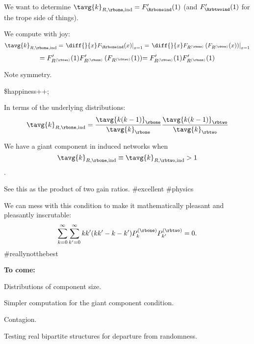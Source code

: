       We want to determine $\tavg{k}_{R,\rbone,\textnormal{ind}} = F'_{\Rrboneind}(1)$ 
      (and $F'_{\Rrbtwoind}(1)$ for the trope side of things).
    
      We compute with joy:
      $$
      \tavg{k}_{R,\rbone,\textnormal{ind}}
      =
      \left.
      \diff{}{x}
        F_{\Rrboneind}(x)
      \right|_{x=1}
      =
      {
      \left.
      \diff{}{x}
        F_{R^{(\rbone)}}
        \left(
          F_{R^{(\rbtwo)}}(x)      
        \right)
      \right|_{x=1}
    }
    $$
    $$
    {
      =
      F'_{R^{(\rbtwo)}}(1)
        F'_{R^{(\rbone)}}
        \left(
          F_{R^{(\rbtwo)}}(1)
        \right)
      }
      {
        =
        F'_{R^{(\rbtwo)}}(1)
        F'_{R^{(\rbone)}}(1)
      }
      $$
    
      Note symmetry. 
    
      \$happiness++;
    
  
  


  
    
    
      In terms of the underlying distributions:
      $$
      \tavg{k}_{R,\rbone,\textnormal{ind}}
      =
      \frac{\tavg{k(k-1)}_{\rbone}}
      {\tavg{k}_{\rbone}}
      \frac{\tavg{k(k-1)}_{\rbtwo}}
      {\tavg{k}_{\rbtwo}}
      $$
    
      We have a giant component in  
      induced networks when 
      $$
      \tavg{k}_{R,\rbone,\textnormal{ind}}
      \equiv
      \tavg{k}_{R,\rbtwo,\textnormal{ind}}
      > 1
      $$.
    
      See this as the product of two gain ratios. \newline
      {\#excellent} 
      {\#physics}
    
      We can mess with this condition to make it mathematically pleasant
      and pleasantly inscrutable:
      $$
      \sum_{k=0}^{\infty}
      \sum_{k'=0}^{\infty}
      kk'(kk'-k-k') P^{(\rbone)}_{k} P^{(\rbtwo)}_{k'} = 0.
      $$
      {\#reallynotthebest}
    
  


  \textbf{To come:}
    
     
      Distributions of component size.
     
      Simpler computation for the giant component condition.
     
      Contagion.
     
      Testing real bipartite structures for departure from randomness.
    
